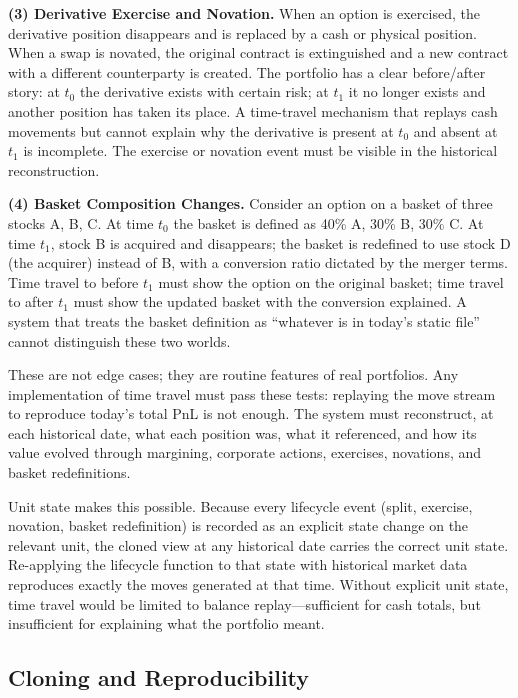 \documentclass[11pt,a4paper]{article}
\begin{document}
\noindent\textbf{(3) Derivative Exercise and Novation.} When an option is exercised, the derivative position disappears and is replaced by a cash or physical position. When a swap is novated, the original contract is extinguished and a new contract with a different counterparty is created. The portfolio has a clear before/after story: at $t_0$ the derivative exists with certain risk; at $t_1$ it no longer exists and another position has taken its place. A time-travel mechanism that replays cash movements but cannot explain why the derivative is present at $t_0$ and absent at $t_1$ is incomplete. The exercise or novation event must be visible in the historical reconstruction.

\noindent\textbf{(4) Basket Composition Changes.} Consider an option on a basket of three stocks A, B, C. At time $t_0$ the basket is defined as 40\% A, 30\% B, 30\% C. At time $t_1$, stock B is acquired and disappears; the basket is redefined to use stock D (the acquirer) instead of B, with a conversion ratio dictated by the merger terms. Time travel to before $t_1$ must show the option on the original basket; time travel to after $t_1$ must show the updated basket with the conversion explained. A system that treats the basket definition as ``whatever is in today's static file'' cannot distinguish these two worlds.

These are not edge cases; they are routine features of real portfolios. Any implementation of time travel must pass these tests: replaying the move stream to reproduce today's total PnL is not enough. The system must reconstruct, at each historical date, what each position was, what it referenced, and how its value evolved through margining, corporate actions, exercises, novations, and basket redefinitions.

Unit state makes this possible. Because every lifecycle event (split, exercise, novation, basket redefinition) is recorded as an explicit state change on the relevant unit, the cloned view at any historical date carries the correct unit state. Re-applying the lifecycle function to that state with historical market data reproduces exactly the moves generated at that time. Without explicit unit state, time travel would be limited to balance replay---sufficient for cash totals, but insufficient for explaining what the portfolio meant.

\subsection{Cloning and Reproducibility}
\end{document}
